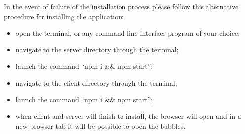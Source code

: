 In the event of failure of the installation process please follow this alternative procedure for installing the application:
\begin{itemize}
	\item open the terminal, or any command-line interface program of your choice;
	\item navigate to the server directory through the terminal;
	\item launch the command ``npm i \&\& npm start'';
	\item navigate to the client directory through the terminal;
	\item launch the command ``npm i \&\& npm start'';
	\item when client and server will finish to install, the browser will open and in a new browser tab it will be possible to open the bubbles.
\end{itemize}
